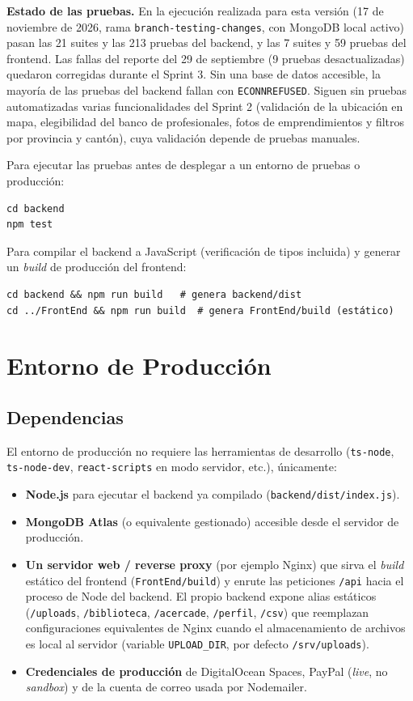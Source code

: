 \textbf{Estado de las pruebas.} En la ejecución realizada para esta versión (17 de noviembre de 2026, rama \texttt{branch-testing-changes}, con MongoDB local activo) pasan las 21 suites y las 213 pruebas del backend, y las 7 suites y 59 pruebas del frontend. Las fallas del reporte del 29 de septiembre (9 pruebas desactualizadas) quedaron corregidas durante el Sprint 3. Sin una base de datos accesible, la mayoría de las pruebas del backend fallan con \texttt{ECONNREFUSED}. Siguen sin pruebas automatizadas varias funcionalidades del Sprint 2 (validación de la ubicación en mapa, elegibilidad del banco de profesionales, fotos de emprendimientos y filtros por provincia y cantón), cuya validación depende de pruebas manuales.

Para ejecutar las pruebas antes de desplegar a un entorno de pruebas o producción:
\begin{verbatim}
cd backend
npm test
\end{verbatim}
Para compilar el backend a JavaScript (verificación de tipos incluida) y generar un \textit{build} de producción del frontend:
\begin{verbatim}
cd backend && npm run build   # genera backend/dist
cd ../FrontEnd && npm run build  # genera FrontEnd/build (estático)
\end{verbatim}

\section{Entorno de Producción}

\subsection{Dependencias}
El entorno de producción no requiere las herramientas de desarrollo (\texttt{ts-node}, \texttt{ts-node-dev}, \texttt{react-scripts} en modo servidor, etc.), únicamente:
\begin{itemize}
    \item \textbf{Node.js} para ejecutar el backend ya compilado (\texttt{backend/dist/index.js}).
    \item \textbf{MongoDB Atlas} (o equivalente gestionado) accesible desde el servidor de producción.
    \item \textbf{Un servidor web / reverse proxy} (por ejemplo Nginx) que sirva el \textit{build} estático del frontend (\texttt{FrontEnd/build}) y enrute las peticiones \texttt{/api} hacia el proceso de Node del backend. El propio backend expone alias estáticos (\texttt{/uploads}, \texttt{/biblioteca}, \texttt{/acercade}, \texttt{/perfil}, \texttt{/csv}) que reemplazan configuraciones equivalentes de Nginx cuando el almacenamiento de archivos es local al servidor (variable \texttt{UPLOAD\_DIR}, por defecto \texttt{/srv/uploads}).
    \item \textbf{Credenciales de producción} de DigitalOcean Spaces, PayPal (\textit{live}, no \textit{sandbox}) y de la cuenta de correo usada por Nodemailer.
\end{itemize}


